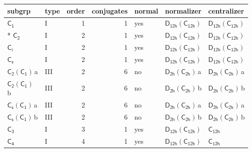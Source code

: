 \documentclass[10pt,a4paper]{article}
\numberwithin{equation}{section}
\newcommand{\grp}[1]{\mathsf{#1}}
\newcommand{\clsletter}[1]{\,{\scriptsize\color{black!55}#1}}
\begin{document}
{\small\begin{longtable}{@{}llrrlll@{}}\toprule
subgrp & type & order & conjugates & normal & normalizer & centralizer\\\midrule\endhead
\bottomrule\endfoot\endlastfoot
\href{../../../rotation/data/pdf/C1.pdf}{$\grp{C_{1}}$} & I & 1 & 1 & yes & \href{D12h-C12h.pdf}{$\grp{D_{12h}}(\grp{C_{12h}})$} & \href{D12h-C12h.pdf}{$\grp{D_{12h}}(\grp{C_{12h}})$}\\*
\href{../../../rotation/data/pdf/C2.pdf}{$\grp{C_{2}}$} & I & 2 & 1 & yes & \href{D12h-C12h.pdf}{$\grp{D_{12h}}(\grp{C_{12h}})$} & \href{D12h-C12h.pdf}{$\grp{D_{12h}}(\grp{C_{12h}})$}\\
\href{../../../rotation/data/pdf/S2.pdf}{$\grp{C_{i}}$} & I & 2 & 1 & yes & \href{D12h-C12h.pdf}{$\grp{D_{12h}}(\grp{C_{12h}})$} & \href{D12h-C12h.pdf}{$\grp{D_{12h}}(\grp{C_{12h}})$}\\
\href{../../../rotation/data/pdf/C1v.pdf}{$\grp{C_{s}}$} & I & 2 & 1 & yes & \href{D12h-C12h.pdf}{$\grp{D_{12h}}(\grp{C_{12h}})$} & \href{D12h-C12h.pdf}{$\grp{D_{12h}}(\grp{C_{12h}})$}\\
\href{C2-C1.pdf}{$\grp{C_{2}}(\grp{C_{1}})$}\clsletter{a} & III & 2 & 6 & no & \href{D2h-C2h.pdf}{$\grp{D_{2h}}(\grp{C_{2h}})$}\clsletter{a} & \href{D2h-C2h.pdf}{$\grp{D_{2h}}(\grp{C_{2h}})$}\clsletter{a}\\
\href{C2-C1.pdf}{$\grp{C_{2}}(\grp{C_{1}})$}\clsletter{b} & III & 2 & 6 & no & \href{D2h-C2h.pdf}{$\grp{D_{2h}}(\grp{C_{2h}})$}\clsletter{b} & \href{D2h-C2h.pdf}{$\grp{D_{2h}}(\grp{C_{2h}})$}\clsletter{b}\\
\href{C1v-C1.pdf}{$\grp{C_{s}}(\grp{C_{1}})$}\clsletter{a} & III & 2 & 6 & no & \href{D2h-C2h.pdf}{$\grp{D_{2h}}(\grp{C_{2h}})$}\clsletter{a} & \href{D2h-C2h.pdf}{$\grp{D_{2h}}(\grp{C_{2h}})$}\clsletter{a}\\
\href{C1v-C1.pdf}{$\grp{C_{s}}(\grp{C_{1}})$}\clsletter{b} & III & 2 & 6 & no & \href{D2h-C2h.pdf}{$\grp{D_{2h}}(\grp{C_{2h}})$}\clsletter{b} & \href{D2h-C2h.pdf}{$\grp{D_{2h}}(\grp{C_{2h}})$}\clsletter{b}\\
\href{../../../rotation/data/pdf/C3.pdf}{$\grp{C_{3}}$} & I & 3 & 1 & yes & \href{D12h-C12h.pdf}{$\grp{D_{12h}}(\grp{C_{12h}})$} & \href{../../../rotation/data/pdf/C12h.pdf}{$\grp{C_{12h}}$}\\
\href{../../../rotation/data/pdf/C4.pdf}{$\grp{C_{4}}$} & I & 4 & 1 & yes & \href{D12h-C12h.pdf}{$\grp{D_{12h}}(\grp{C_{12h}})$} & \href{../../../rotation/data/pdf/C12h.pdf}{$\grp{C_{12h}}$}\\

\end{longtable}}
\end{document}
